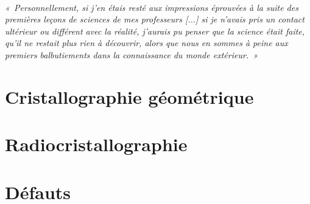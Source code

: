 \documentclass[a4paper,justified,twoside,nobib]{tufte-book}
\renewcommand{\=}[1]{\stackrel{#1}{=}} %
\begin{document}
\tableofcontents\thispagestyle{empty}



\cleardoublepage
~\vfill
\begin{doublespace}
\noindent\fontsize{18
}{22}\selectfont\itshape
\nohyphenation
«~Personnellement, si j'en étais resté aux impressions éprouvées à la suite des
premières leçons de sciences de mes professeurs [...] si je n'avais pris un
contact ultérieur ou différent avec la réalité, j'aurais pu penser que la
science était faite, qu'il ne restait plus rien à découvrir, alors que nous en
sommes à peine aux premiers balbutiements dans la connaissance du monde
extérieur.~»\\

\end{doublespace}
\vfill
\vfill

\mainmatter

\part[CRISTALLOGRAPHIE GÉOMÉTRIQUE]{Cristallographie géométrique}





\part[RADIOCRISTALLOGRAPHIE]{Radiocristallographie}




\part[DÉFAUTS]{Défauts}




%    
%    


%
%    
%    


\backmatter

\printindex
\end{document}

